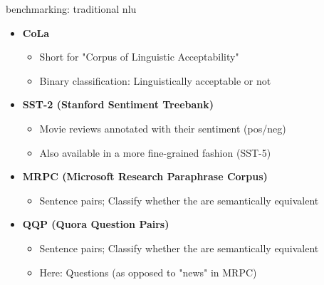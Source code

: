 \begin{vbframe}{benchmarking: traditional nlu}

\vfill

\begin{itemize}
	\item \textbf{CoLa}
	\begin{itemize}
		\item Short for "Corpus of Linguistic Acceptability"
		\item Binary classification: Linguistically acceptable or not
	\end{itemize}
	\item \textbf{SST-2 (Stanford Sentiment Treebank)} 
	\begin{itemize}
		\item Movie reviews annotated with their sentiment (pos/neg)
		\item Also available in a more fine-grained fashion (SST-5)
	\end{itemize}
	\item \textbf{MRPC (Microsoft Research Paraphrase Corpus)}
	\begin{itemize}
		\item Sentence pairs; Classify whether the are semantically equivalent
	\end{itemize}
	\item \textbf{QQP (Quora Question Pairs)} 
	\begin{itemize}
		\item Sentence pairs; Classify whether the are semantically equivalent
		\item Here: Questions (as opposed to "news" in MRPC)
	\end{itemize}
\end{itemize}

\vfill

\end{vbframe}


